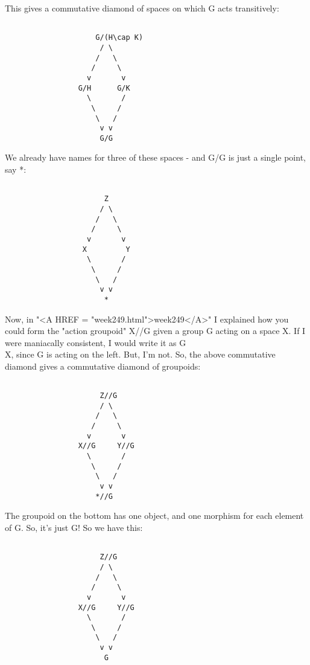 This gives a commutative diamond of spaces on which G acts 
transitively:


\begin{verbatim}

                     G/(H\cap K)
                      / \
                     /   \
                    /     \
                   v       v
                 G/H      G/K
                   \       /
                    \     /
                     \   /
                      v v
                      G/G
\end{verbatim}
    
We already have names for three of these spaces - and G/G is just
a single point, say *:


\begin{verbatim}

                       Z
                      / \
                     /   \
                    /     \
                   v       v
                  X         Y
                   \       /
                    \     /
                     \   /
                      v v
                       *
\end{verbatim}
    
Now, in "<A HREF = "week249.html">week249</A>" I explained how you could form the "action groupoid"
X//G given a group G acting on a space X.  If I were maniacally 
consistent, I would write it as G\\X, since G is acting on the left.  
But, I'm not.  So, the above commutative diamond gives a commutative 
diamond of groupoids:


\begin{verbatim}

                      Z//G
                      / \
                     /   \
                    /     \
                   v       v
                 X//G     Y//G
                   \       /
                    \     /
                     \   /
                      v v
                     *//G
\end{verbatim}
    
The groupoid on the bottom has one object, and one morphism for each
element of G.  So, it's just G!  So we have this:


\begin{verbatim}

                      Z//G
                      / \
                     /   \
                    /     \
                   v       v
                 X//G     Y//G
                   \       /
                    \     /
                     \   /
                      v v
                       G
\end{verbatim}
    

